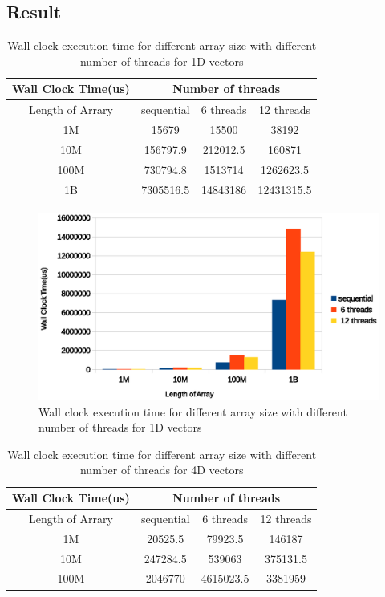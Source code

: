 \documentclass{article}
\begin{document}
\subsection{Result}
\begin{table}[h]
  \centering
  \begin{tabular}{|c|c|c|c|}
    \hline
    Wall Clock Time(us) & \multicolumn{3}{|c|}{Number of threads} \\
    \hline
    Length of Arrary & sequential & 6 threads & 12 threads \\
    \hline
    1M	& 15679	& 15500	& 38192 \\
    \hline
    10M	& 156797.9 & 212012.5 &	160871 \\
    \hline
    100M & 730794.8 & 1513714 &	1262623.5 \\
    \hline
    1B & 7305516.5 & 14843186 &	12431315.5 \\
    \hline
  \end{tabular}
  \caption{Wall clock execution time for different array size with different
    number of threads for 1D vectors}
  \label{table:1D_p2}
\end{table}

\begin{figure}[!htb]
  \centering
  \includegraphics[width=\textwidth]{fig/1D_p2}
  \caption{Wall clock execution time for different array size with
    different number of threads for 1D
    vectors}
  \label{fig:1D_p2}
\end{figure}

\begin{table}[h]
  \centering
  \begin{tabular}{|c|c|c|c|}
    \hline
    Wall Clock Time(us) & \multicolumn{3}{|c|}{Number of threads} \\
    \hline
    Length of Arrary & sequential & 6 threads & 12 threads \\
    \hline
    1M & 20525.5 & 79923.5 & 146187 \\
    \hline
    10M	& 247284.5 & 539063 & 375131.5 \\
    \hline
    100M & 2046770 & 4615023.5 & 3381959 \\
    \hline
  \end{tabular}
  \caption{Wall clock execution time for different array size with different
    number of threads for 4D vectors}
  \label{table:4D_p2}
\end{table}
\end{document}
